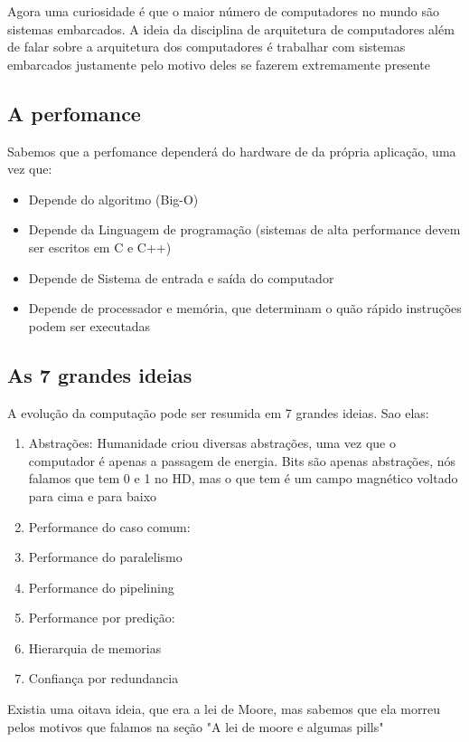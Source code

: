 \documentclass[12pt,a4paper]{report}
\begin{document}
	Agora uma curiosidade é que o maior número de computadores no mundo são sistemas embarcados. A ideia da disciplina de arquitetura de computadores além de falar sobre a arquitetura dos computadores é trabalhar com sistemas embarcados justamente pelo motivo deles se fazerem extremamente presente
	
	
	\subsection{A perfomance}
	Sabemos que a perfomance dependerá do hardware de da própria aplicação, uma vez que:
	
	\begin{itemize}
		\item Depende do algoritmo (Big-O)
		\item Depende da Linguagem de programação (sistemas de alta performance devem ser escritos em C e C++)
		\item Depende de Sistema de entrada e saída do computador
		\item Depende de processador e memória, que determinam o quão rápido instruções podem ser executadas 
	\end{itemize}
	
	\subsection{As 7 grandes ideias}
	A evolução da computação pode ser resumida em 7 grandes ideias. Sao elas:
	
	\begin{enumerate}
		\item Abstrações: Humanidade criou diversas abstrações, uma vez que o computador é apenas a passagem de energia. Bits são apenas abstrações, nós falamos que tem 0 e 1 no HD, mas o que tem é um campo magnético voltado para cima e para baixo
		\item Performance do caso comum:
		\item Performance do paralelismo
		\item Performance do pipelining
		\item Performance por predição:
		\item Hierarquia de memorias
		\item Confiança por redundancia
	\end{enumerate}
	
	
	Existia uma oitava ideia, que era a lei de Moore, mas sabemos que ela morreu pelos motivos que falamos na seção "A lei de moore e algumas pills"
	
\end{document}
